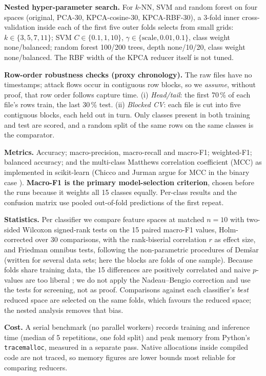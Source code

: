 \documentclass[runningheads]{llncs}
\begin{document}
\textbf{Nested hyper-parameter search.} For $k$-NN, SVM and random forest on four spaces (original, PCA-30, KPCA-cosine-30, KPCA-RBF-30), a 3-fold inner cross-validation inside each of the first five outer folds selects from small grids: $k\in\{3,5,7,11\}$; SVM $C\in\{0.1,1,10\}$, $\gamma\in\{\text{scale},0.01,0.1\}$, class weight none/balanced; random forest 100/200 trees, depth none/10/20, class weight none/balanced. The RBF width of the KPCA reducer itself is not tuned.

\textbf{Row-order robustness checks (proxy chronology).} The raw files have no timestamps; attack flows occur in contiguous row blocks, so we \emph{assume}, without proof, that row order follows capture time. (i) \emph{Head/tail}: the first 70\,\% of each file's rows train, the last 30\,\% test. (ii) \emph{Blocked CV}: each file is cut into five contiguous blocks, each held out in turn. Only classes present in both training and test are scored, and a random split of the same rows on the same classes is the comparator.

\textbf{Metrics.} Accuracy; macro-precision, macro-recall and macro-F1; weighted-F1; balanced accuracy; and the multi-class Matthews correlation coefficient (MCC) as implemented in scikit-learn (Chicco and Jurman argue for MCC in the binary case \cite{chicco2020}). \textbf{Macro-F1 is the primary model-selection criterion}, chosen before the runs because it weights all 15 classes equally. Per-class results and the confusion matrix use pooled out-of-fold predictions of the first repeat.

\textbf{Statistics.} Per classifier we compare feature spaces at matched $n=10$ with two-sided Wilcoxon signed-rank tests on the 15 paired macro-F1 values, Holm-corrected over 30 comparisons, with the rank-biserial correlation $r$ as effect size, and Friedman omnibus tests, following the non-parametric procedures of Dem\v{s}ar \cite{demsar2006} (written for several data sets; here the blocks are folds of one sample). Because folds share training data, the 15 differences are positively correlated and naive $p$-values are too liberal \cite{nadeau2003}; we do not apply the Nadeau--Bengio correction and use the tests for screening, not as proof. Comparisons against each classifier's \emph{best} reduced space are selected on the same folds, which favours the reduced space; the nested analysis removes that bias.

\textbf{Cost.} A serial benchmark (no parallel workers) records training and inference time (median of 5 repetitions, one fold split) and peak memory from Python's \texttt{tracemalloc}, measured in a separate pass. Native allocations inside compiled code are not traced, so memory figures are lower bounds most reliable for comparing reducers.
\end{document}
